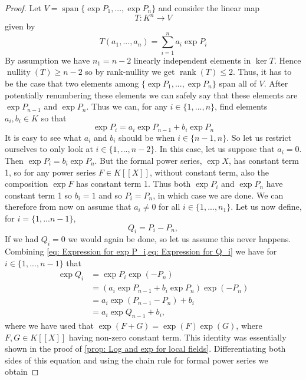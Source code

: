 \documentclass{article}
\DeclareMathOperator{\rank}{rank}
\DeclareMathOperator{\nullity}{nullity}
\newcommand{\Span}{\operatorname{span}}
\numberwithin{equation}{section}
\begin{document}
\begin{proof}
	Let $V = \Span \{ \exp P_1,...,\exp P_n\}$ and consider the linear map $$T : K^n \to V$$ given by
	$$T(a_1, ..., a_n) = \sum_{i=1}^n a_i \exp P_i$$
	By assumption we have $n_1 = n - 2$ linearly independent elements in $\ker T$. Hence $\nullity (T) \geq n-2$ so by rank-nullity we get $\rank (T) \leq 2$. Thus, it has to be the case that two elements among $\{\exp P_1,...,\exp P_n \}$ span all of $V$. After potentially renumbering these elements we can safely say that these elements are $\exp{P_{n-1}}$ and $\exp{P_{n}}$. Thus we can, for any $i \in \{1, ..., n\}$, find elements $a_i, b_i \in K$ so that
	\begin{equation} \label{eq: Expression for exp P_i}
    	\exp P_i = a_i \exp P_{n-1} + b_i \exp P_n
	\end{equation}
	It is easy to see what $a_i$ and $b_i$ should be when $i \in \{n-1, n\}$. So let us restrict ourselves to only look at $i \in \{1, ..., n-2\}$. In this case, let us suppose that $a_i = 0$. Then $\exp P_i = b_i \exp P_n$. But the formal power series, $\exp X$, has constant term 1, so for any power series $F \in K[[X]]$, without constant term, also the composition $\exp F$ has constant term 1. Thus both $\exp P_i$ and $\exp P_n$ have constant term 1 so $b_i = 1$ and so $P_i = P_n$, in which case we are done. We can therefore from now on assume that $a_i \neq 0$ for all $i \in \{1, ..., n_1 \}$. Let us now define, for $i = \{1, ... n-1 \}$,
	\begin{equation}\label{eq: Expression for Q_i}
    	Q_i = P_i - P_n,
	\end{equation}
	If we had $Q_i = 0$ we would again be done, so let us assume this never happens. Combining \cref{eq: Expression for exp P_i,eq: Expression for Q_i} we have for $i \in  \{1, ..., n-1\}$ that
	\begin{align*}
    	\exp Q_i & = \exp P_i \exp (-P_n)                      	\\
             	& = (a_i \exp P_{n-1} + b_i \exp P_n) \exp (-P_n) \\
             	& = a_i \exp (P_{n-1} - P_n) + b_i            	\\
             	& = a_i \exp Q_{n-1} + b_i,
	\end{align*}
	where we have used that $\exp(F + G) = \exp(F)\exp(G)$, where $F, G \in K[[X]]$ having non-zero constant term. This identity was essentially shown in the proof of \cref{prop: Log and exp for local fields}. Differentiating both sides of this equation and using the chain rule for formal power series we obtain

\end{proof}
\end{document}
